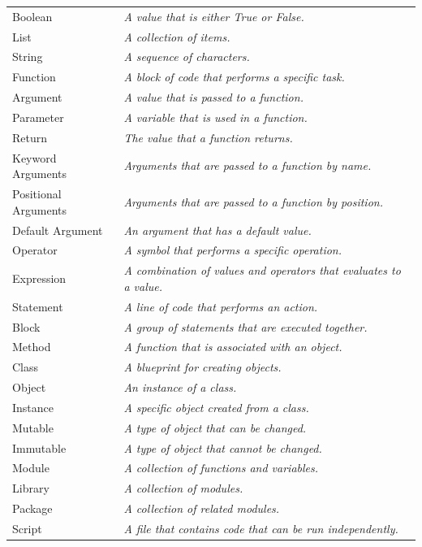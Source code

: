 \documentclass[
  letterpaper,
  DIV=11,
  numbers=noendperiod]{scrreprt}
\begin{document}
\begin{longtable}[]{@{}
  >{\raggedright\arraybackslash}p{}
  >{\raggedright\arraybackslash}p{}@{}}
Boolean & \emph{A value that is either True or False.} \\
List & \emph{A collection of items.} \\
String & \emph{A sequence of characters.} \\
Function & \emph{A block of code that performs a specific task.} \\
Argument & \emph{A value that is passed to a function.} \\
Parameter & \emph{A variable that is used in a function.} \\
Return & \emph{The value that a function returns.} \\
Keyword Arguments & \emph{Arguments that are passed to a function by
name.} \\
Positional Arguments & \emph{Arguments that are passed to a function by
position.} \\
Default Argument & \emph{An argument that has a default value.} \\
Operator & \emph{A symbol that performs a specific operation.} \\
Expression & \emph{A combination of values and operators that evaluates
to a value.} \\
Statement & \emph{A line of code that performs an action.} \\
Block & \emph{A group of statements that are executed together.} \\
Method & \emph{A function that is associated with an object.} \\
Class & \emph{A blueprint for creating objects.} \\
Object & \emph{An instance of a class.} \\
Instance & \emph{A specific object created from a class.} \\
Mutable & \emph{A type of object that can be changed.} \\
Immutable & \emph{A type of object that cannot be changed.} \\
Module & \emph{A collection of functions and variables.} \\
Library & \emph{A collection of modules.} \\
Package & \emph{A collection of related modules.} \\
Script & \emph{A file that contains code that can be run
independently.} \\
\end{longtable}
\end{document}

